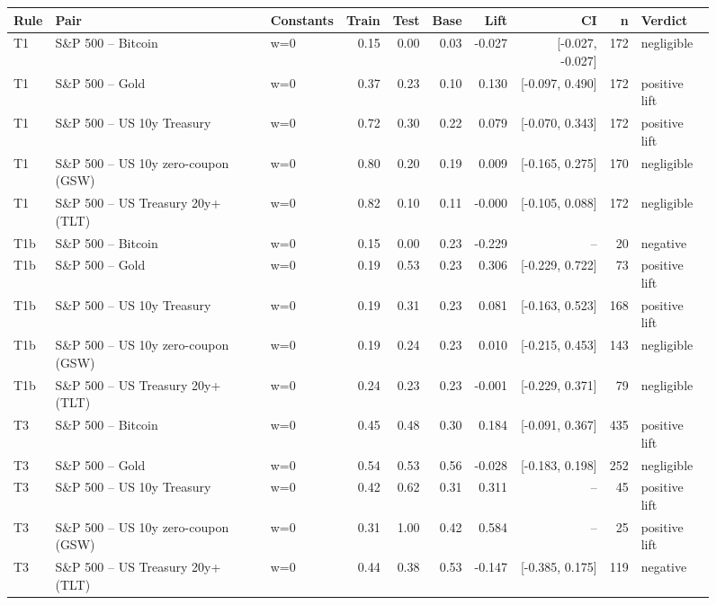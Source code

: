 \begin{figure}
\centering
\begin{tabular}{lllrrrrrrl}
\toprule
Rule & Pair & Constants & Train & Test & Base & Lift & CI & n & Verdict \\
\midrule
T1 & S\&P 500 -- Bitcoin & w=0 & 0.15 & 0.00 & 0.03 & -0.027 & [-0.027, -0.027] & 172 & negligible \\
T1 & S\&P 500 -- Gold & w=0 & 0.37 & 0.23 & 0.10 & 0.130 & [-0.097, 0.490] & 172 & positive lift \\
T1 & S\&P 500 -- US 10y Treasury & w=0 & 0.72 & 0.30 & 0.22 & 0.079 & [-0.070, 0.343] & 172 & positive lift \\
T1 & S\&P 500 -- US 10y zero-coupon (GSW) & w=0 & 0.80 & 0.20 & 0.19 & 0.009 & [-0.165, 0.275] & 170 & negligible \\
T1 & S\&P 500 -- US Treasury 20y+ (TLT) & w=0 & 0.82 & 0.10 & 0.11 & -0.000 & [-0.105, 0.088] & 172 & negligible \\
T1b & S\&P 500 -- Bitcoin & w=0 & 0.15 & 0.00 & 0.23 & -0.229 & -- & 20 & negative \\
T1b & S\&P 500 -- Gold & w=0 & 0.19 & 0.53 & 0.23 & 0.306 & [-0.229, 0.722] & 73 & positive lift \\
T1b & S\&P 500 -- US 10y Treasury & w=0 & 0.19 & 0.31 & 0.23 & 0.081 & [-0.163, 0.523] & 168 & positive lift \\
T1b & S\&P 500 -- US 10y zero-coupon (GSW) & w=0 & 0.19 & 0.24 & 0.23 & 0.010 & [-0.215, 0.453] & 143 & negligible \\
T1b & S\&P 500 -- US Treasury 20y+ (TLT) & w=0 & 0.24 & 0.23 & 0.23 & -0.001 & [-0.229, 0.371] & 79 & negligible \\
T3 & S\&P 500 -- Bitcoin & w=0 & 0.45 & 0.48 & 0.30 & 0.184 & [-0.091, 0.367] & 435 & positive lift \\
T3 & S\&P 500 -- Gold & w=0 & 0.54 & 0.53 & 0.56 & -0.028 & [-0.183, 0.198] & 252 & negligible \\
T3 & S\&P 500 -- US 10y Treasury & w=0 & 0.42 & 0.62 & 0.31 & 0.311 & -- & 45 & positive lift \\
T3 & S\&P 500 -- US 10y zero-coupon (GSW) & w=0 & 0.31 & 1.00 & 0.42 & 0.584 & -- & 25 & positive lift \\
T3 & S\&P 500 -- US Treasury 20y+ (TLT) & w=0 & 0.44 & 0.38 & 0.53 & -0.147 & [-0.385, 0.175] & 119 & negative \\

\end{tabular}
\end{figure}
